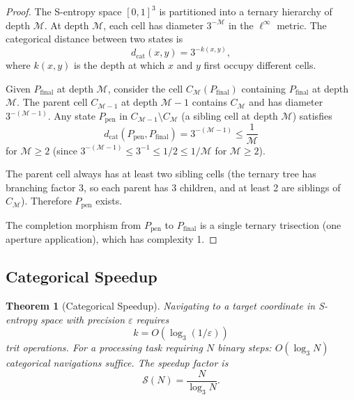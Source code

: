 \documentclass[twocolumn,10pt]{article}
\newtheorem{theorem}{Theorem}[section]
\theoremstyle{remark}
\newcommand{\Depth}{\mathcal{M}}
\newcommand{\eps}{\varepsilon}
\begin{document}
\begin{proof}
The S-entropy space $[0,1]^3$ is partitioned into a ternary hierarchy of depth $\Depth$. At depth $\Depth$, each cell has diameter $3^{-\Depth}$ in the $\ell^\infty$ metric. The categorical distance between two states is
\begin{equation}
d_{\mathrm{cat}}(x, y) = 3^{-k(x,y)},
\end{equation}
where $k(x,y)$ is the depth at which $x$ and $y$ first occupy different cells.

Given $P_{\mathrm{final}}$ at depth $\Depth$, consider the cell $C_{\Depth}(P_{\mathrm{final}})$ containing $P_{\mathrm{final}}$ at depth $\Depth$. The parent cell $C_{\Depth-1}$ at depth $\Depth - 1$ contains $C_{\Depth}$ and has diameter $3^{-(\Depth-1)}$. Any state $P_{\mathrm{pen}}$ in $C_{\Depth-1} \setminus C_{\Depth}$ (a sibling cell at depth $\Depth$) satisfies
\begin{equation}
d_{\mathrm{cat}}(P_{\mathrm{pen}}, P_{\mathrm{final}}) = 3^{-(\Depth-1)} \leq \frac{1}{\Depth}
\end{equation}
for $\Depth \geq 2$ (since $3^{-(\Depth-1)} \leq 3^{-1} \leq 1/2 \leq 1/\Depth$ for $\Depth \geq 2$).

The parent cell always has at least two sibling cells (the ternary tree has branching factor 3, so each parent has 3 children, and at least 2 are siblings of $C_{\Depth}$). Therefore $P_{\mathrm{pen}}$ exists.

The completion morphism from $P_{\mathrm{pen}}$ to $P_{\mathrm{final}}$ is a single ternary trisection (one aperture application), which has complexity 1.
\end{proof}

\subsection{Categorical Speedup}

\begin{theorem}[Categorical Speedup]
\label{thm:speedup}
Navigating to a target coordinate in S-entropy space with precision $\eps$ requires
\begin{equation}
k = O(\log_3(1/\eps))
\label{eq:nav_complexity}
\end{equation}
trit operations. For a processing task requiring $N$ binary steps: $O(\log_3 N)$ categorical navigations suffice. The speedup factor is
\begin{equation}
\mathcal{S}(N) = \frac{N}{\log_3 N}.
\label{eq:speedup_factor}
\end{equation}
\end{theorem}
\end{document}
